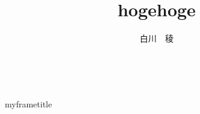 \documentclass{beamer}           %
\title{hogehoge}
\author{白川　稜}
\begin{document}
~ \\
\vspace{10pt}
\begin{beamercolorbox}[
    wd=\textwidth,
    sep=32pt,     %
]{myframetitle}
\begin{center}
	{\huge \inserttitle} \\
	\medskip
	\medskip
	{\Large \insertauthor} \\
\end{center}
\end{beamercolorbox}

\begin{columns}[T]
	\begin{column}{0.50\textwidth}
		
	\end{column}
	\begin{column}{0.50\textwidth}
	\end{column}
\end{columns}
\end{document}
